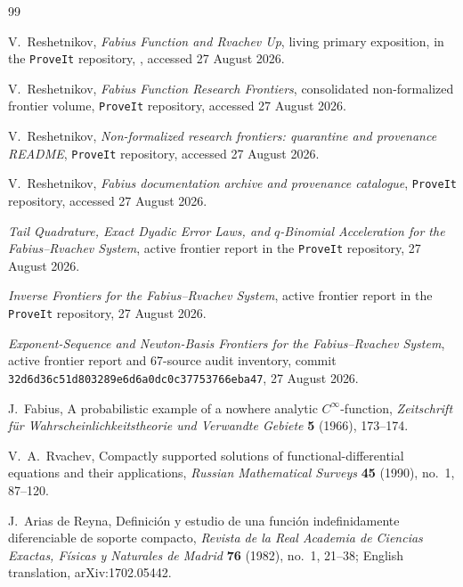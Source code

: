 \documentclass[11pt,oneside]{article}
\numberwithin{equation}{section}
\theoremstyle{definition}
\theoremstyle{remark}
\begin{document}
\begin{thebibliography}{99}

V.~Reshetnikov,
\newblock \emph{Fabius Function and Rvachev Up}, living primary exposition,
\newblock in the \texttt{ProveIt} repository, , accessed 27 August 2026.

V.~Reshetnikov,
\newblock \emph{Fabius Function Research Frontiers}, consolidated non-formalized frontier volume,
\newblock \texttt{ProveIt} repository, accessed 27 August 2026.

V.~Reshetnikov,
\newblock \emph{Non-formalized research frontiers: quarantine and provenance README},
\newblock \texttt{ProveIt} repository, accessed 27 August 2026.

V.~Reshetnikov,
\newblock \emph{Fabius documentation archive and provenance catalogue},
\newblock \texttt{ProveIt} repository, accessed 27 August 2026.

\emph{Tail Quadrature, Exact Dyadic Error Laws, and $q$-Binomial Acceleration for the Fabius--Rvachev System},
\newblock active frontier report in the \texttt{ProveIt} repository, 27 August 2026.

\emph{Inverse Frontiers for the Fabius--Rvachev System},
\newblock active frontier report in the \texttt{ProveIt} repository, 27 August 2026.

\emph{Exponent-Sequence and Newton-Basis Frontiers for the Fabius--Rvachev System},
\newblock active frontier report and 67-source audit inventory,
\newblock commit \texttt{32d6d36c51d803289e6d6a0dc0c37753766eba47}, 27 August 2026.

J.~Fabius,
\newblock A probabilistic example of a nowhere analytic $C^\infty$-function,
\newblock \emph{Zeitschrift f\"ur Wahrscheinlichkeitstheorie und Verwandte Gebiete}
\textbf{5} (1966), 173--174.

V.~A.~Rvachev,
\newblock Compactly supported solutions of functional-differential equations and their applications,
\newblock \emph{Russian Mathematical Surveys} \textbf{45} (1990), no.~1, 87--120.

J.~Arias de Reyna,
\newblock Definici\'on y estudio de una funci\'on indefinidamente diferenciable de soporte compacto,
\newblock \emph{Revista de la Real Academia de Ciencias Exactas, F\'isicas y Naturales de Madrid}
\textbf{76} (1982), no.~1, 21--38;
\newblock English translation, arXiv:1702.05442.


\end{thebibliography}
\end{document}
